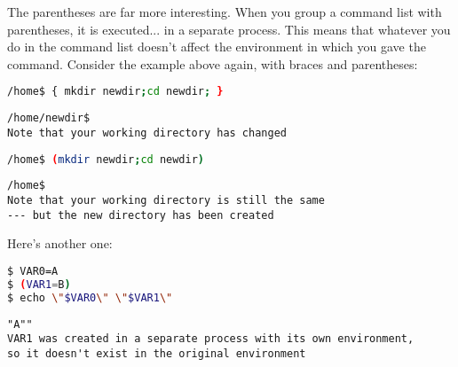 The parentheses are far more interesting. When you group a command list with
parentheses, it is executed... in a separate process. This means that whatever
you do in the command list doesn't affect the environment in which you gave the
command. Consider the example above again, with braces and parentheses:

\lstset{basicstyle=\scriptsize, numbers=left, captionpos=b, tabsize=4}
\begin{lstlisting}[caption=Create a directory and change into it all in one go grouped with curly braces,language={bash},
breaklines=true,xleftmargin=15pt,label=lst:Create a directory and change into it all in one go grouped with curly braces]
/home$ { mkdir newdir;cd newdir; }
\end{lstlisting}

\scriptsize
\begin{verbatim}
/home/newdir$
Note that your working directory has changed
\end{verbatim}
\normalsize

\lstset{basicstyle=\scriptsize, numbers=left, captionpos=b, tabsize=4}
\begin{lstlisting}[caption=Create a directory and change into it all in one go grouped with parentheses,language={bash},
breaklines=true,xleftmargin=15pt,label=lst:Create a directory and change into it all in one go grouped with parentheses]
/home$ (mkdir newdir;cd newdir)
\end{lstlisting}

\scriptsize
\begin{verbatim}
/home$
Note that your working directory is still the same 
--- but the new directory has been created
\end{verbatim}
\normalsize

Here's another one:

\lstset{basicstyle=\scriptsize, numbers=left, captionpos=b, tabsize=4}
\begin{lstlisting}[caption=Creating shell variables in the current and in a new environment,language={bash},
breaklines=true,xleftmargin=15pt,label=lst:Creating shell variables in the current and in a new environment]
$ VAR0=A
$ (VAR1=B)
$ echo \"$VAR0\" \"$VAR1\"
\end{lstlisting}

\scriptsize
\begin{verbatim}
"A""
VAR1 was created in a separate process with its own environment,
so it doesn't exist in the original environment
\end{verbatim}
\normalsize


